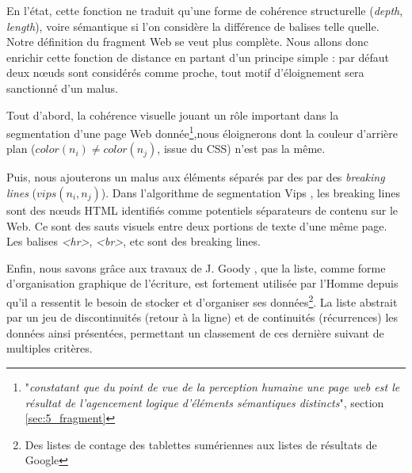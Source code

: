 \documentclass[symmetric,justified,marginals=raggedouter]{tufte-book}
\begin{document}
\begin{algorithm} 
\end{algorithm}

\noindent En l'état, cette fonction ne traduit qu'une forme de cohérence structurelle (\textit{depth}, \textit{length}), voire sémantique si l'on considère la différence de balises telle quelle. Notre définition du fragment Web se veut plus complète. Nous allons donc enrichir cette fonction de distance en partant d'un principe simple : par défaut deux nœuds sont considérés comme proche, tout motif d'éloignement sera sanctionné d'un malus.

Tout d'abord, la cohérence visuelle jouant un rôle important dans la segmentation d'une page Web donnée\footnote{"\textit{constatant que du point de vue de la perception humaine \citep{bernard_criteria_2003, michailidou_visual_2008} une page web est le résultat de l'agencement logique d'éléments sémantiques distincts}",  section \ref{sec:5_fragment}},nous éloignerons dont la couleur d'arrière plan ($color(n_i) \neq color(n_j)$, issue du CSS) n'est pas la même.

Puis, nous ajouterons un malus aux éléments séparés par des par des \textit{breaking lines} ($vips(n_i,n_j)$). Dans l'algorithme de segmentation Vips \citep{cai_vips:_2003}, les breaking lines sont des nœuds HTML identifiés comme potentiels séparateurs de contenu sur le Web. Ce sont des sauts visuels entre deux portions de texte d'une même page. Les balises \textit{<hr>}, \textit{<br>}, etc sont des breaking lines.   

Enfin, nous savons grâce aux travaux de J. Goody \citep{goody_raison_1979}, que la liste, comme forme d'organisation graphique de l'écriture, est fortement utilisée par l'Homme depuis qu'il a ressentit le besoin de stocker et d'organiser ses données\footnote{Des listes de contage des tablettes sumériennes aux listes de résultats de Google}. La liste abstrait par un jeu de discontinuités (retour à la ligne) et de continuités (récurrences) les données ainsi présentées, permettant un classement de ces dernière suivant de multiples critères. 
\end{document}
